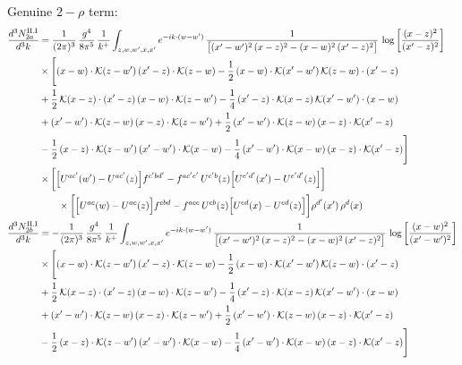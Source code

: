\documentclass[9pt]{article}
\numberwithin{equation}{section}
\begin{document}
Genuine $2-\rho$ term:
\begin{align}
\frac{d^{3}N^{\rm II.I}_{2a}}{d^{3}k}&=\frac{1}{(2\pi)^{3}}\,\frac{g^{4}}{8\pi^{5}}\,\frac{1}{k^{+}}\int_{z,w,w^{\prime},x,x^{\prime}}e^{-ik\cdot{(w-w^{\prime})}}\,\frac{1}{\big[(x^{\prime}-w^{\prime})^{2}\,(x-z)^{2}-(x-w)^{2}\,(x^{\prime}-z)^{2}\big]}\,\log\left[\frac{(x-z)^{2}}{(x^{\prime}-z)^{2}}\right]\notag\\
&\times\Bigg[(x-w)\cdot\mathcal{K}(z-w^{\prime})\,(x^{\prime}-z)\cdot\mathcal{K}(z-w)-\frac{1}{2}\,(x-w)\cdot\mathcal{K}(x^{\prime}-w^{\prime})\,\mathcal{K}(z-w)\cdot(x^{\prime}-z)\notag \\ & +\frac{1}{2}\,\mathcal{K}(x-z)\cdot(x^{\prime}-z)\,(x-w)\cdot\mathcal{K}(z-w^{\prime}) -\frac{1}{4}\,(x^{\prime}-z)\cdot\mathcal{K}(x-z)\,\mathcal{K}(x^{\prime}-w^{\prime})\cdot(x-w)\notag \\ & +(x^{\prime}-w^{\prime})\cdot\mathcal{K}(z-w)\,(x-z)\cdot\mathcal{K}(z-w^{\prime})+\frac{1}{2}\,(x^{\prime}-w^{\prime})\cdot\mathcal{K}(z-w)\,(x-z)\cdot\mathcal{K}(x^{\prime}-z)\notag \\ & -\frac{1}{2}\,(x-z)\cdot\mathcal{K}(z-w^{\prime})\,(x^{\prime}-w^{\prime})\cdot\mathcal{K}(x-w)-\frac{1}{4}\,(x^{\prime}-w^{\prime})\cdot\mathcal{K}(x-w)\,(x-z)\cdot\mathcal{K}(x^{\prime}-z)\Bigg]\notag \\ & \times\bigg[\Big[U^{ac'}(w')-U^{ac'}(z)\Big]f^{c'bd'}-f^{ac'e'}\,U^{c'b}(z)\Big[U^{e'd'}(x')-U^{e'd'}(z)\Big]\bigg]\notag\\&\qquad\times\bigg[\Big[U^{ac}(w)-U^{ac}(z)\Big]f^{cbd}-f^{ace}\,U^{cb}(z)\Big[U^{ed}(x)-U^{ed}(z)\Big]\bigg]\rho^{d'}(x')\,\rho^{d}(x)\\
\frac{d^{3}N^{\rm II.I}_{2b}}{d^{3}k}&= -\frac{1}{(2\pi)^{3}}\,\frac{g^{4}}{8\pi^{5}}\,\frac{1}{k^{+}}\int_{z,w,w^{\prime},x,x^{\prime}}e^{-ik\cdot{(w-w^{\prime})}}\,\frac{1}{\big[(x^{\prime}-w^{\prime})^{2}\,(x-z)^{2}-(x-w)^{2}\,(x^{\prime}-z)^{2}\big]}\,\log\left[\frac{(x-w)^{2}}{(x^{\prime}-w^{\prime})^{2}}\right]\notag\\
&\times\Bigg[(x-w)\cdot\mathcal{K}(z-w^{\prime})\,(x^{\prime}-z)\cdot\mathcal{K}(z-w)-\frac{1}{2}\,(x-w)\cdot\mathcal{K}(x^{\prime}-w^{\prime})\,\mathcal{K}(z-w)\cdot(x^{\prime}-z)\notag \\ & +\frac{1}{2}\,\mathcal{K}(x-z)\cdot(x^{\prime}-z)\,(x-w)\cdot\mathcal{K}(z-w^{\prime}) -\frac{1}{4}\,(x^{\prime}-z)\cdot\mathcal{K}(x-z)\,\mathcal{K}(x^{\prime}-w^{\prime})\cdot(x-w)\notag \\ & +(x^{\prime}-w^{\prime})\cdot\mathcal{K}(z-w)\,(x-z)\cdot\mathcal{K}(z-w^{\prime})+\frac{1}{2}\,(x^{\prime}-w^{\prime})\cdot\mathcal{K}(z-w)\,(x-z)\cdot\mathcal{K}(x^{\prime}-z)\notag \\ & -\frac{1}{2}\,(x-z)\cdot\mathcal{K}(z-w^{\prime})\,(x^{\prime}-w^{\prime})\cdot\mathcal{K}(x-w)-\frac{1}{4}\,(x^{\prime}-w^{\prime})\cdot\mathcal{K}(x-w)\,(x-z)\cdot\mathcal{K}(x^{\prime}-z)\Bigg]\notag\\

\end{align}
\end{document}
